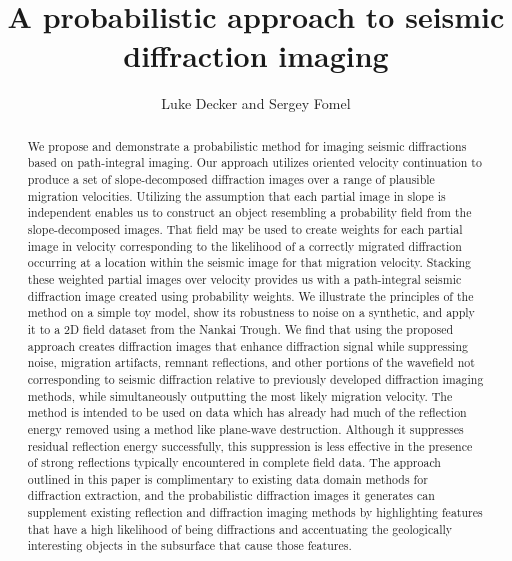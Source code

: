 

\title{A probabilistic approach to seismic diffraction imaging}
\author{Luke Decker and Sergey Fomel}
\address{
Oden Institute for Computational Engineering and Sciences \\
The University of Texas at Austin \\
201 E 24th St, \\
Austin, TX 78712 \\
decker.luke@utexas.edu
}


\maketitle
\begin{abstract}

We propose and demonstrate a probabilistic method for imaging seismic diffractions based on path-integral imaging.  Our approach utilizes oriented velocity continuation to produce a set of slope-decomposed diffraction images over a range of plausible migration velocities.  Utilizing the assumption that each partial image in slope is independent enables us to construct an object resembling a probability field from the  slope-decomposed images. That field may be used to create weights for each partial image in velocity corresponding to the likelihood of a correctly migrated diffraction occurring at a location within the seismic image for that migration velocity.  Stacking these weighted partial images over velocity provides us with a path-integral seismic diffraction image created using probability weights.  We illustrate the principles of the method on a simple toy model, show its robustness to noise on a synthetic,  and apply it to a 2D field dataset from the Nankai Trough. 
We find that using the proposed approach creates diffraction images that  enhance diffraction signal while suppressing noise, migration artifacts, remnant reflections, and other portions of the wavefield not corresponding to seismic diffraction relative to previously developed diffraction imaging methods, while simultaneously outputting the most likely migration velocity. The method is intended to be used on data which has already had much of the reflection energy removed using a method like plane-wave destruction.  Although it suppresses residual reflection energy successfully, this suppression is less effective in the presence of strong reflections typically encountered in complete field data. The approach outlined in this paper is complimentary to existing data domain methods for diffraction extraction, and the probabilistic diffraction images it generates can supplement existing reflection and diffraction imaging methods by highlighting features that have a high likelihood of being diffractions and accentuating the geologically interesting objects in the subsurface that cause those features. 

\end{abstract}

